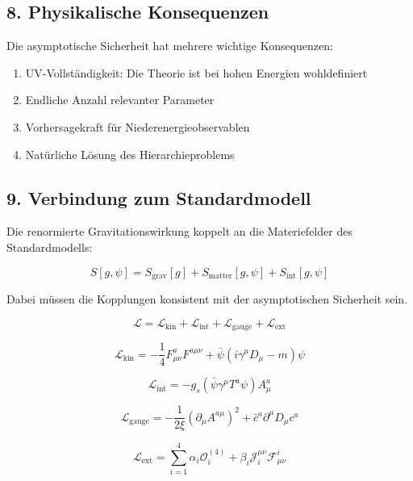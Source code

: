 \documentclass{article}
\begin{document}
\subsection{8. Physikalische Konsequenzen}

Die asymptotische Sicherheit hat mehrere wichtige Konsequenzen:

\begin{enumerate}
	\item UV-Vollständigkeit: Die Theorie ist bei hohen Energien wohldefiniert
	\item Endliche Anzahl relevanter Parameter
	\item Vorhersagekraft für Niederenergieobservablen
	\item Natürliche Lösung des Hierarchieproblems
\end{enumerate}

\subsection{9. Verbindung zum Standardmodell}

Die renormierte Gravitationswirkung koppelt an die Materiefelder des Standardmodells:

\[
S[g,\psi] = S_\text{grav}[g] + S_\text{matter}[g,\psi] + S_\text{int}[g,\psi]
\]

Dabei müssen die Kopplungen konsistent mit der asymptotischen Sicherheit sein.

\begin{equation}
	\mathcal{L} = \mathcal{L}_\text{kin} + \mathcal{L}_\text{int} + \mathcal{L}_\text{gauge} + \mathcal{L}_\text{ext}
\end{equation}

\begin{equation}
	\mathcal{L}_\text{kin} = -\frac{1}{4}F_{\mu\nu}^a F^{a\mu\nu} + \bar{\psi}(i\gamma^\mu D_\mu - m)\psi
\end{equation}

\begin{equation}
	\mathcal{L}_\text{int} = -g_s(\bar{\psi}\gamma^\mu T^a\psi)A_\mu^a
\end{equation}

\begin{equation}
	\mathcal{L}_\text{gauge} = -\frac{1}{2\xi}(\partial_\mu A^{a\mu})^2 + \bar{c}^a\partial^\mu D_\mu c^a
\end{equation}

\begin{equation}
	\mathcal{L}_\text{ext} = \sum_{i=1}^4 \alpha_i \mathcal{O}_i^{(4)} + \beta_i\mathcal{J}_i^{\mu\nu}\mathcal{F}_{\mu\nu}^i
\end{equation}
\end{document}
